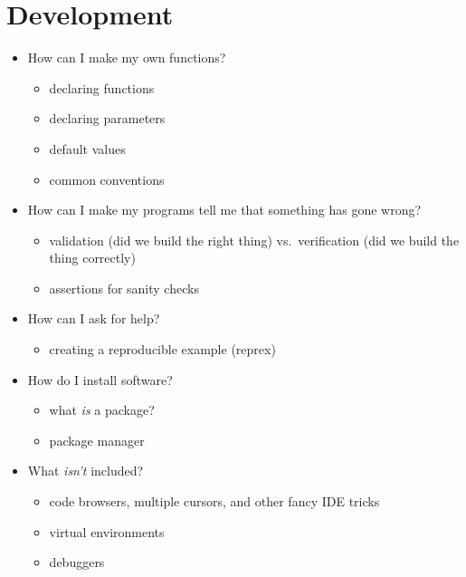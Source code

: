 \documentclass[]{Nemilov}
\providecommand{\tightlist}{%
  \setlength{\itemsep}{0pt}\setlength{\parskip}{0pt}}
\begin{document}
\hypertarget{development}{%
\section{Development}\label{development}}

\begin{itemize}
\tightlist
\item
  How can I make my own functions?

  \begin{itemize}
  \tightlist
  \item
    declaring functions
  \item
    declaring parameters
  \item
    default values
  \item
    common conventions
  \end{itemize}
\item
  How can I make my programs tell me that something has gone wrong?

  \begin{itemize}
  \tightlist
  \item
    validation (did we build the right thing) vs.~verification (did we build the thing correctly)
  \item
    assertions for sanity checks
  \end{itemize}
\item
  How can I ask for help?

  \begin{itemize}
  \tightlist
  \item
    creating a reproducible example (reprex)
  \end{itemize}
\item
  How do I install software?

  \begin{itemize}
  \tightlist
  \item
    what \emph{is} a package?
  \item
    package manager
  \end{itemize}
\item
  What \emph{isn't} included?

  \begin{itemize}
  \tightlist
  \item
    code browsers, multiple cursors, and other fancy IDE tricks
  \item
    virtual environments
  \item
    debuggers
  \end{itemize}
\end{itemize}
\end{document}
